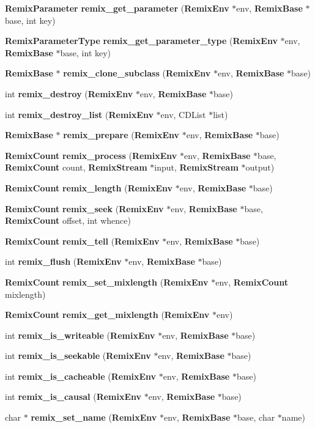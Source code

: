 \begin{DoxyCompactItemize}
\item 
{\bf RemixParameter} {\bf remix\_\-get\_\-parameter} ({\bf RemixEnv} $\ast$env, {\bf RemixBase} $\ast$base, int key)
\item 
{\bf RemixParameterType} {\bf remix\_\-get\_\-parameter\_\-type} ({\bf RemixEnv} $\ast$env, {\bf RemixBase} $\ast$base, int key)
\item 
{\bf RemixBase} $\ast$ {\bf remix\_\-clone\_\-subclass} ({\bf RemixEnv} $\ast$env, {\bf RemixBase} $\ast$base)
\item 
int {\bf remix\_\-destroy} ({\bf RemixEnv} $\ast$env, {\bf RemixBase} $\ast$base)
\item 
int {\bf remix\_\-destroy\_\-list} ({\bf RemixEnv} $\ast$env, CDList $\ast$list)
\item 
{\bf RemixBase} $\ast$ {\bf remix\_\-prepare} ({\bf RemixEnv} $\ast$env, {\bf RemixBase} $\ast$base)
\item 
{\bf RemixCount} {\bf remix\_\-process} ({\bf RemixEnv} $\ast$env, {\bf RemixBase} $\ast$base, {\bf RemixCount} count, {\bf RemixStream} $\ast$input, {\bf RemixStream} $\ast$output)
\item 
{\bf RemixCount} {\bf remix\_\-length} ({\bf RemixEnv} $\ast$env, {\bf RemixBase} $\ast$base)
\item 
{\bf RemixCount} {\bf remix\_\-seek} ({\bf RemixEnv} $\ast$env, {\bf RemixBase} $\ast$base, {\bf RemixCount} offset, int whence)
\item 
{\bf RemixCount} {\bf remix\_\-tell} ({\bf RemixEnv} $\ast$env, {\bf RemixBase} $\ast$base)
\item 
int {\bf remix\_\-flush} ({\bf RemixEnv} $\ast$env, {\bf RemixBase} $\ast$base)
\item 
{\bf RemixCount} {\bf remix\_\-set\_\-mixlength} ({\bf RemixEnv} $\ast$env, {\bf RemixCount} mixlength)
\item 
{\bf RemixCount} {\bf remix\_\-get\_\-mixlength} ({\bf RemixEnv} $\ast$env)
\item 
int {\bf remix\_\-is\_\-writeable} ({\bf RemixEnv} $\ast$env, {\bf RemixBase} $\ast$base)
\item 
int {\bf remix\_\-is\_\-seekable} ({\bf RemixEnv} $\ast$env, {\bf RemixBase} $\ast$base)
\item 
int {\bf remix\_\-is\_\-cacheable} ({\bf RemixEnv} $\ast$env, {\bf RemixBase} $\ast$base)
\item 
int {\bf remix\_\-is\_\-causal} ({\bf RemixEnv} $\ast$env, {\bf RemixBase} $\ast$base)
\item 
char $\ast$ {\bf remix\_\-set\_\-name} ({\bf RemixEnv} $\ast$env, {\bf RemixBase} $\ast$base, char $\ast$name)

\end{DoxyCompactItemize}
